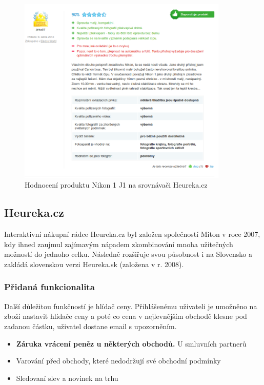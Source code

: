 \begin{figure}[htb]
\begin{center}
\includegraphics[width=100mm]{./pictures/heureka-hodnoceni-produktu.png}
\caption{Hodnocení produktu Nikon 1 J1 na srovnávači Heureka.cz}
\label{fig:heureka-hodnoceni-produktu}
\end{center}
\end{figure}

\subsection{Heureka.cz}
Interaktivní nákupní rádce Heureka.cz byl založen společností Miton v roce 2007, kdy ihned zaujmul zajímavým nápadem zkombinování mnoha užitečných možností do jednoho celku. Následně rozšiřuje svou působnost i na Slovensko a zakládá slovenskou verzi Heureka.sk (založena v r. 2008). \cite{website:wiki:heureka}

\subsubsection{Přidaná funkcionalita}
Další důležitou funkčností je hlídač ceny. Přihlášenému uživateli je umožněno na zboží nastavit hlídače ceny a poté co cena v nejlevnějším obchodě klesne pod zadanou částku, uživatel dostane email s upozorněním.

\begin{itemize}
\item \textbf{Záruka vrácení peněz u některých obchodů.} U smluvních partnerů 
\item Varování před obchody, které nedodržují své obchodní podmínky
\item Sledovaní slev a novinek na trhu
\end{itemize}

